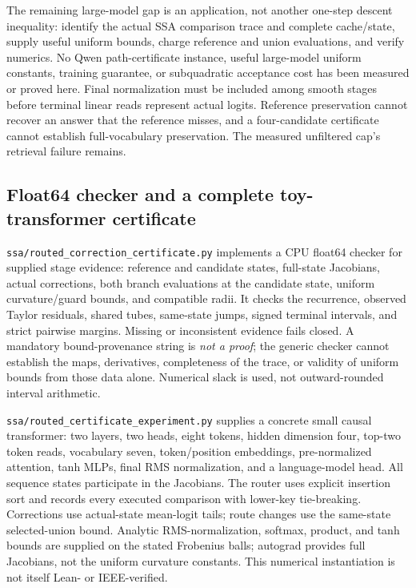 \documentclass[11pt]{article}
\numberwithin{equation}{section}
\begin{document}
The remaining large-model gap is an application, not another one-step descent inequality: identify the actual SSA
comparison trace and complete cache/state, supply useful uniform bounds, charge reference and union
evaluations, and verify numerics. No Qwen path-certificate instance, useful large-model uniform constants,
training guarantee, or subquadratic acceptance cost has been measured or proved here. Final
normalization must be included among smooth stages before terminal linear reads represent actual logits.
Reference preservation cannot recover an answer that the reference misses, and a four-candidate
certificate cannot establish full-vocabulary preservation. The measured unfiltered cap's retrieval failure remains.

\subsection{Float64 checker and a complete toy-transformer certificate}

\nolinkurl{ssa/routed_correction_certificate.py} implements a CPU float64 checker for supplied stage
evidence: reference and candidate states, full-state Jacobians, actual corrections, both branch evaluations
at the candidate state, uniform curvature/guard bounds, and compatible radii. It checks the recurrence,
observed Taylor residuals, shared tubes, same-state jumps, signed terminal intervals, and strict pairwise
margins. Missing or inconsistent evidence fails closed. A mandatory bound-provenance string is \emph{not
a proof}; the generic checker cannot establish the maps, derivatives, completeness of the trace, or
validity of uniform bounds from those data alone. Numerical slack is used, not outward-rounded
interval arithmetic.

\nolinkurl{ssa/routed_certificate_experiment.py} supplies a concrete small causal transformer: two layers,
two heads, eight tokens, hidden dimension four, top-two token reads, vocabulary seven, token/position
embeddings, pre-normalized attention, tanh MLPs, final RMS normalization, and a language-model head.
All sequence states participate in the Jacobians. The router uses explicit insertion sort and records
every executed comparison with lower-key tie-breaking. Corrections use actual-state mean-logit tails;
route changes use the same-state selected-union bound. Analytic RMS-normalization, softmax, product,
and tanh bounds are supplied on the stated Frobenius balls; autograd provides full Jacobians, not the
uniform curvature constants. This numerical instantiation is not itself Lean- or IEEE-verified.
\end{document}
